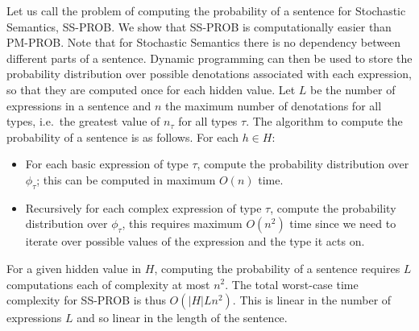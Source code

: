 \documentclass[manuscript]{clv2}
\begin{document}
Let us call the problem of computing the probability of a sentence for Stochastic Semantics, SS-PROB. We show that SS-PROB is computationally easier than PM-PROB.
Note that for Stochastic Semantics there is no dependency between different parts of a sentence.
Dynamic
programming can then be used to store the probability distribution over possible
denotations associated with each expression, so that they are computed once for
each hidden value. Let $L$ be the number of expressions in a sentence and
$n$ the maximum number of denotations for all types, i.e.~the greatest
value of $n_\tau$ for all types $\tau$. The algorithm to compute the
probability of a sentence is as follows. For each $h\in H$:
\begin{itemize}
\item For each basic expression of type $\tau$, compute the
  probability distribution over $\phi_\tau$; this can be computed in
  maximum $O(n)$ time.
\item Recursively for each complex expression of type $\tau$, compute
  the probability distribution over $\phi_\tau$, this requires maximum
  $O(n^2)$ time since we need to iterate over possible values of the
  expression and the type it acts on.
\end{itemize}
For a given hidden value in $H$, computing the probability of a sentence requires $L$
computations each of complexity at most $n^2$. The total worst-case
time complexity for SS-PROB is thus $O(|H|Ln^2)$. This is linear in the number of expressions $L$ and so linear in the length of the sentence. 





\end{document}
